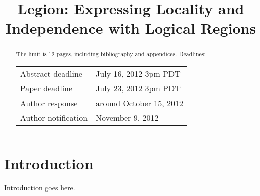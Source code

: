 \documentclass{sig-alternate}
\begin{document}
\title{Legion: Expressing Locality and Independence with Logical Regions}
\author{}
\maketitle

\begin{abstract}
The limit is 12 pages, including bibliography and appendices.
Deadlines:
\begin{tabular}{ll}
Abstract deadline & July 16, 2012 3pm PDT \\
Paper deadline & July 23, 2012 3pm PDT \\
Author response & around October 15, 2012 \\
Author notification & November 9, 2012
\end{tabular}
\end{abstract}

\section{Introduction}
\label{sect:intro}
Introduction goes here.





{
\small

}
\end{document}
